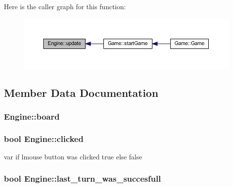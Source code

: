 Here is the caller graph for this function\+:\nopagebreak
\begin{figure}[H]
\begin{center}
\leavevmode
\includegraphics[width=350pt]{class_engine_aaa07c6646868b4f752fbb91c3ec5380c_icgraph}
\end{center}
\end{figure}




\subsection{Member Data Documentation}
\hypertarget{class_engine_aab263540a0e814e6304a3ef6b751b097}{}
\subsubsection[{board}]{ Engine\+::board\hspace{0.3cm}{\ttfamily [private]}}\label{class_engine_aab263540a0e814e6304a3ef6b751b097}
\hypertarget{class_engine_a9c9336f739cd336a1346a17504857a45}{}
\subsubsection[{clicked}]{\setlength{\rightskip}{0pt plus 5cm}bool Engine\+::clicked\hspace{0.3cm}{\ttfamily [private]}}\label{class_engine_a9c9336f739cd336a1346a17504857a45}


var if lmouse button was clicked true else false 

\hypertarget{class_engine_a7dbc1e409179b77add60013155b684a0}{}
\subsubsection[{last\+\_\+turn\+\_\+was\+\_\+succesfull}]{\setlength{\rightskip}{0pt plus 5cm}bool Engine\+::last\+\_\+turn\+\_\+was\+\_\+succesfull\hspace{0.3cm}{\ttfamily [private]}}\label{class_engine_a7dbc1e409179b77add60013155b684a0}


